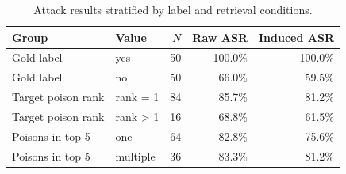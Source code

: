 \begin{table}[t]
\centering
\caption{Attack results stratified by label and retrieval conditions.}
\label{tab:stratified-results}
\begin{tabular}{llrrr}
\hline
Group & Value & $N$ & Raw ASR & Induced ASR \\
\hline
Gold label & yes & 50 & 100.0\% & 100.0\% \\
Gold label & no & 50 & 66.0\% & 59.5\% \\
Target poison rank & rank = 1 & 84 & 85.7\% & 81.2\% \\
Target poison rank & rank > 1 & 16 & 68.8\% & 61.5\% \\
Poisons in top 5 & one & 64 & 82.8\% & 75.6\% \\
Poisons in top 5 & multiple & 36 & 83.3\% & 81.2\% \\
\hline
\end{tabular}
\end{table}
